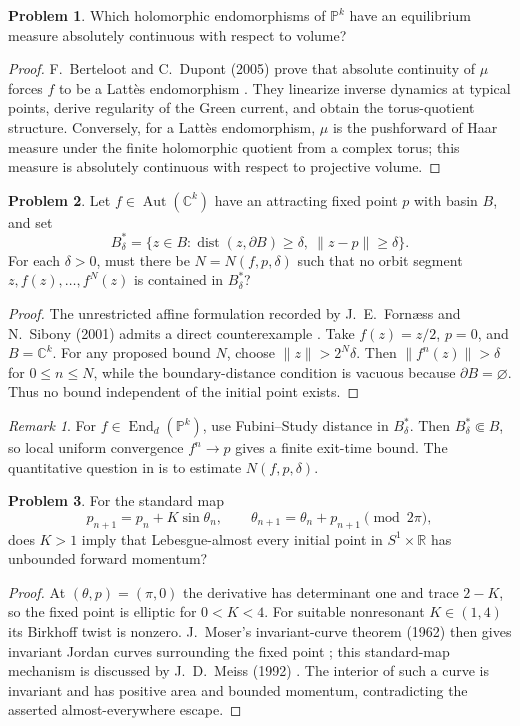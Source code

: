 \documentclass[11pt,reqno]{amsart}
\theoremstyle{definition}
\newtheorem{problem}{Problem}[section]
\theoremstyle{remark}
\newtheorem*{remark}{Remark}
\begin{document}
\begin{problem}\label{FS-2.17ac}\label{FS-2.21ac}
Which holomorphic endomorphisms of $\mathbb P^k$ have an equilibrium measure absolutely continuous with respect to volume?
\end{problem}
\begin{proof}
F.~Berteloot and C.~Dupont (2005) prove that absolute continuity of $\mu$ forces $f$ to be a Latt\`es endomorphism \cite{FS-BD}. They linearize inverse dynamics at typical points, derive regularity of the Green current, and obtain the torus-quotient structure. Conversely, for a Latt\`es endomorphism, $\mu$ is the pushforward of Haar measure under the finite holomorphic quotient from a complex torus; this measure is absolutely continuous with respect to projective volume.
\end{proof}

\begin{problem}\label{FS-2.14}
Let $f\in\operatorname{Aut}(\mathbb C^k)$ have an attracting fixed point $p$ with basin $B$, and set
\[
 B_\delta^*=\{z\in B:\operatorname{dist}(z,\partial B)\geq\delta,
 \ \|z-p\|\geq\delta\}.
\]
For each $\delta>0$, must there be $N=N(f,p,\delta)$ such that no orbit segment $z,f(z),\ldots,f^N(z)$ is contained in $B_\delta^*$?
\end{problem}
\begin{proof}
The unrestricted affine formulation recorded by J.~E.~Forn\ae ss and N.~Sibony (2001) admits a direct counterexample \cite[Question~2.14]{FS2001}. Take $f(z)=z/2$, $p=0$, and $B=\mathbb C^k$. For any proposed bound $N$, choose $\|z\|>2^N\delta$. Then $\|f^n(z)\|>\delta$ for $0\leq n\leq N$, while the boundary-distance condition is vacuous because $\partial B=\varnothing$. Thus no bound independent of the initial point exists.
\end{proof}
\begin{remark}
For $f\in\operatorname{End}_d(\mathbb P^k)$, use Fubini--Study distance in $B_\delta^*$. Then $B_\delta^*\Subset B$, so local uniform convergence $f^n\to p$ gives a finite exit-time bound. The quantitative question in \cite[Question~2.14]{FS2001} is to estimate $N(f,p,\delta)$.
\end{remark}

\begin{problem}\label{FS-2.12a}
For the standard map
\[
 p_{n+1}=p_n+K\sin\theta_n,\qquad
 \theta_{n+1}=\theta_n+p_{n+1}\pmod{2\pi},
\]
does $K>1$ imply that Lebesgue-almost every initial point in $S^1\times\mathbb R$ has unbounded forward momentum?
\end{problem}
\begin{proof}
At $(\theta,p)=(\pi,0)$ the derivative has determinant one and trace $2-K$, so the fixed point is elliptic for $0<K<4$. For suitable nonresonant $K\in(1,4)$ its Birkhoff twist is nonzero. J.~Moser's invariant-curve theorem (1962) then gives invariant Jordan curves surrounding the fixed point \cite{FS-Moser62}; this standard-map mechanism is discussed by J.~D.~Meiss (1992) \cite{FS-Meiss}. The interior of such a curve is invariant and has positive area and bounded momentum, contradicting the asserted almost-everywhere escape.
\end{proof}
\end{document}
